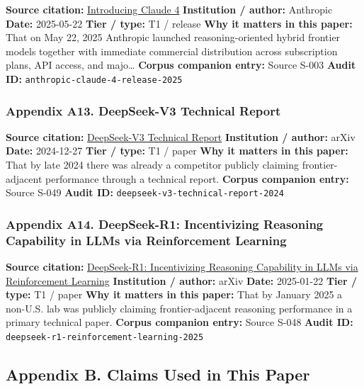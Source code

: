 \documentclass[
  american,
  11pt,
  letterpaper,
]{article}
\begin{document}
\textbf{Source citation:}
\href{https://www.anthropic.com/news/claude-4}{Introducing Claude 4}
\textbf{Institution / author:} Anthropic \textbf{Date:} 2025-05-22
\textbf{Tier / type:} T1 / release \textbf{Why it matters in this
paper:} That on May 22, 2025 Anthropic launched reasoning-oriented
hybrid frontier models together with immediate commercial distribution
across subscription plans, API access, and majo\ldots{} \textbf{Corpus
companion entry:} Source S-003 \textbf{Audit ID:}
\texttt{anthropic-claude-4-release-2025}

\subsubsection{Appendix A13. DeepSeek-V3 Technical
Report}\label{ch-06-appendix-a13-deepseek-v3-technical-report}

\textbf{Source citation:}
\href{https://arxiv.org/abs/2412.19437}{DeepSeek-V3 Technical Report}
\textbf{Institution / author:} arXiv \textbf{Date:} 2024-12-27
\textbf{Tier / type:} T1 / paper \textbf{Why it matters in this paper:}
That by late 2024 there was already a competitor publicly claiming
frontier-adjacent performance through a technical report. \textbf{Corpus
companion entry:} Source S-049 \textbf{Audit ID:}
\texttt{deepseek-v3-technical-report-2024}

\subsubsection{Appendix A14. DeepSeek-R1: Incentivizing Reasoning
Capability in LLMs via Reinforcement
Learning}\label{ch-06-appendix-a14-deepseek-r1-incentivizing-reasoning-capability-in-llms-via-reinforcement-learning}

\textbf{Source citation:}
\href{https://arxiv.org/abs/2501.12948}{DeepSeek-R1: Incentivizing
Reasoning Capability in LLMs via Reinforcement Learning}
\textbf{Institution / author:} arXiv \textbf{Date:} 2025-01-22
\textbf{Tier / type:} T1 / paper \textbf{Why it matters in this paper:}
That by January 2025 a non-U.S. lab was publicly claiming
frontier-adjacent reasoning performance in a primary technical paper.
\textbf{Corpus companion entry:} Source S-048 \textbf{Audit ID:}
\texttt{deepseek-r1-reinforcement-learning-2025}

\subsection{Appendix B. Claims Used in This
Paper}\label{appendix-b.-claims-used-in-this-paper-6}
\end{document}
